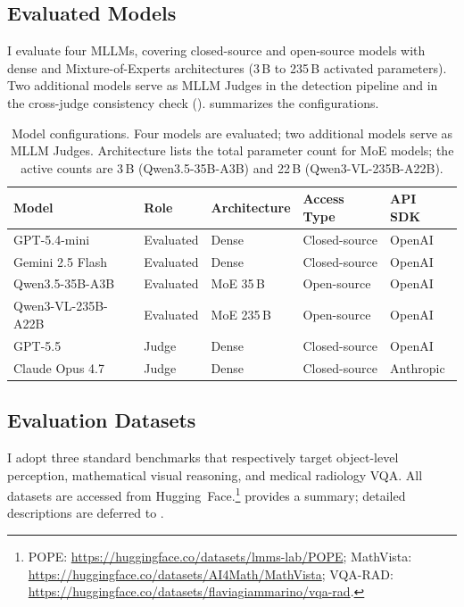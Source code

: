 \subsection{Evaluated Models}

I evaluate four MLLMs,
covering closed-source and open-source models
with dense and Mixture-of-Experts architectures
(3\,B to 235\,B activated parameters).
Two additional models serve as MLLM Judges
in the detection pipeline and in the cross-judge consistency check
().
 summarizes the configurations.

\begin{table}[htbp]
  \centering
  \caption{Model configurations.
    Four models are evaluated;
    two additional models serve as MLLM Judges.
    Architecture lists the total parameter count for MoE models;
    the active counts are 3\,B (Qwen3.5-35B-A3B)
    and 22\,B (Qwen3-VL-235B-A22B).}
  \label{tab:model_config}
  \small
  \setlength{\tabcolsep}{3pt}
  \begin{tabular}{lllll}
    \toprule
    Model & Role & Architecture & Access Type & API SDK \\
    \midrule
    GPT-5.4-mini \citep{openaiModelsOverview}
      & Evaluated & Dense           & Closed-source & OpenAI \\
    Gemini 2.5 Flash \citep{googleGeminiModels}
      & Evaluated & Dense           & Closed-source & OpenAI \\
    Qwen3.5-35B-A3B \citep{qwen35TechnicalReport2025}
      & Evaluated & MoE 35\,B  & Open-source   & OpenAI \\
    Qwen3-VL-235B-A22B \citep{qwen3VLTechnicalReport2025}
      & Evaluated & MoE 235\,B & Open-source  & OpenAI \\
    \midrule
    GPT-5.5 \citep{openaiGPT55Model}
      & Judge     & Dense           & Closed-source & OpenAI \\
    Claude Opus 4.7 \citep{anthropicClaudeOpus47}
      & Judge     & Dense           & Closed-source & Anthropic \\
    \bottomrule
  \end{tabular}
\end{table}

\subsection{Evaluation Datasets}

I adopt three standard benchmarks
that respectively target object-level perception,
mathematical visual reasoning, and medical radiology VQA.
All datasets are accessed from Hugging~Face.\footnote{POPE: \url{https://huggingface.co/datasets/lmms-lab/POPE};
MathVista: \url{https://huggingface.co/datasets/AI4Math/MathVista};
VQA-RAD: \url{https://huggingface.co/datasets/flaviagiammarino/vqa-rad}.}
 provides a summary;
detailed descriptions are deferred to .

